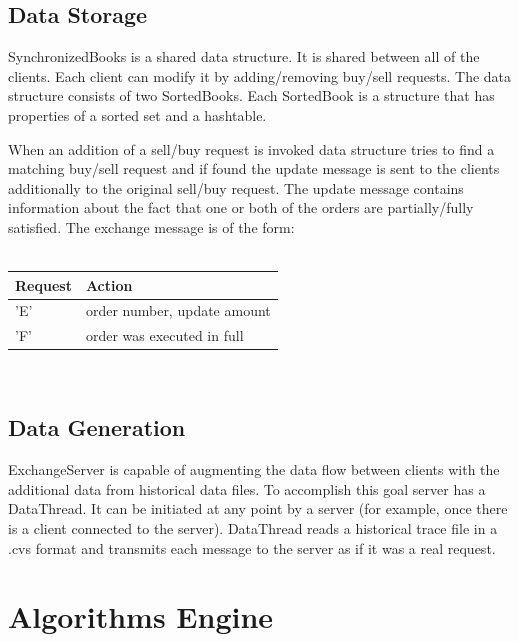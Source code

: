 \documentclass[11pt]{article}
\begin{document}

\subsection{Data Storage}
SynchronizedBooks is a shared data structure. It is shared between all of the clients. Each client can modify it by adding/removing buy/sell requests. The data structure consists of two SortedBooks. Each SortedBook is a structure that has properties of a sorted set and a hashtable. 

When an addition of a sell/buy request is invoked data structure tries to find a matching buy/sell request and if found the update message is sent to the clients additionally to the original sell/buy request. The update message contains information about the fact that one or both of the orders are partially/fully satisfied. The exchange message is of the form:
\\
\\
\begin{tabular}{|l|l|}
  \hline
  Request & Action \\ \hline
  'E' & order number, update amount \\ \hline
  'F' & order was executed in full \\

  \hline
\end{tabular}
\\

\subsection{Data Generation}

ExchangeServer is capable of augmenting the data flow between clients with the additional data from historical data files. To accomplish this goal server has a DataThread. It can be initiated at any point by a server (for example, once there is a client connected to the server). DataThread reads a historical trace file in a .cvs format and transmits each message to the server as if it was a real request.


\section{Algorithms Engine}
\end{document}

